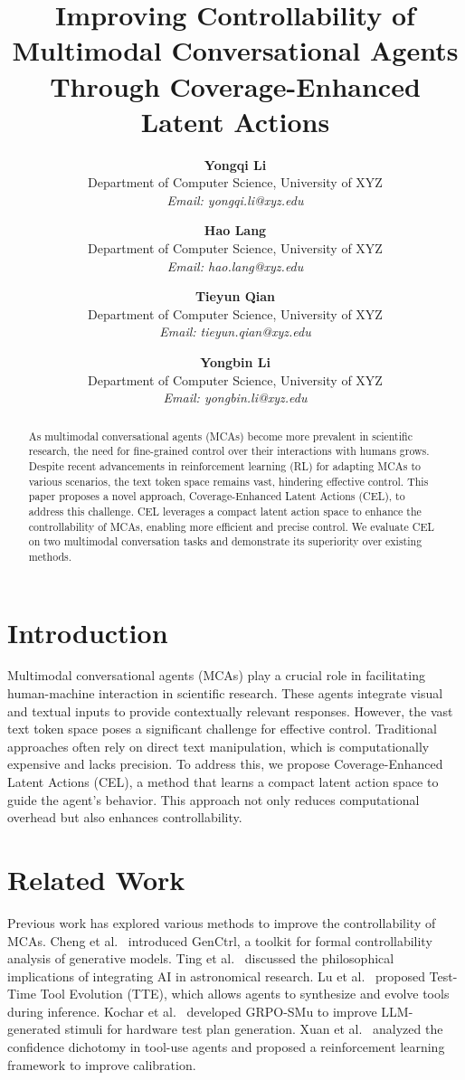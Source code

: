 \documentclass[12pt]{article}
\title{Improving Controllability of Multimodal Conversational Agents Through Coverage-Enhanced Latent Actions}
\author{
    \textbf{Yongqi Li} \\
    Department of Computer Science, University of XYZ \\
    \textit{Email: yongqi.li@xyz.edu} \\
    \and
    \textbf{Hao Lang} \\
    Department of Computer Science, University of XYZ \\
    \textit{Email: hao.lang@xyz.edu} \\
    \and
    \textbf{Tieyun Qian} \\
    Department of Computer Science, University of XYZ \\
    \textit{Email: tieyun.qian@xyz.edu} \\
    \and
    \textbf{Yongbin Li} \\
    Department of Computer Science, University of XYZ \\
    \textit{Email: yongbin.li@xyz.edu} \\
}
\begin{document}
\maketitle

\begin{abstract}
As multimodal conversational agents (MCAs) become more prevalent in scientific research, the need for fine-grained control over their interactions with humans grows. Despite recent advancements in reinforcement learning (RL) for adapting MCAs to various scenarios, the text token space remains vast, hindering effective control. This paper proposes a novel approach, Coverage-Enhanced Latent Actions (CEL), to address this challenge. CEL leverages a compact latent action space to enhance the controllability of MCAs, enabling more efficient and precise control. We evaluate CEL on two multimodal conversation tasks and demonstrate its superiority over existing methods.
\end{abstract}

\section{Introduction}
Multimodal conversational agents (MCAs) play a crucial role in facilitating human-machine interaction in scientific research. These agents integrate visual and textual inputs to provide contextually relevant responses. However, the vast text token space poses a significant challenge for effective control. Traditional approaches often rely on direct text manipulation, which is computationally expensive and lacks precision. To address this, we propose Coverage-Enhanced Latent Actions (CEL), a method that learns a compact latent action space to guide the agent's behavior. This approach not only reduces computational overhead but also enhances controllability.

\section{Related Work}
\label{sec:related_work}
Previous work has explored various methods to improve the controllability of MCAs. Cheng et al.~\cite{cheng2026genctrlformalcontrollability} introduced GenCtrl, a toolkit for formal controllability analysis of generative models. Ting et al.~\cite{ting2026understandingmeansailadenastronomy} discussed the philosophical implications of integrating AI in astronomical research. Lu et al.~\cite{lu2026statictoolstesttimetool} proposed Test-Time Tool Evolution (TTE), which allows agents to synthesize and evolve tools during inference. Kochar et al.~\cite{kochar2026grpostatemutationsimproving} developed GRPO-SMu to improve LLM-generated stimuli for hardware test plan generation. Xuan et al.~\cite{xuan2026confidencedichotomyanalyzingmitigating} analyzed the confidence dichotomy in tool-use agents and proposed a reinforcement learning framework to improve calibration.
\end{document}
